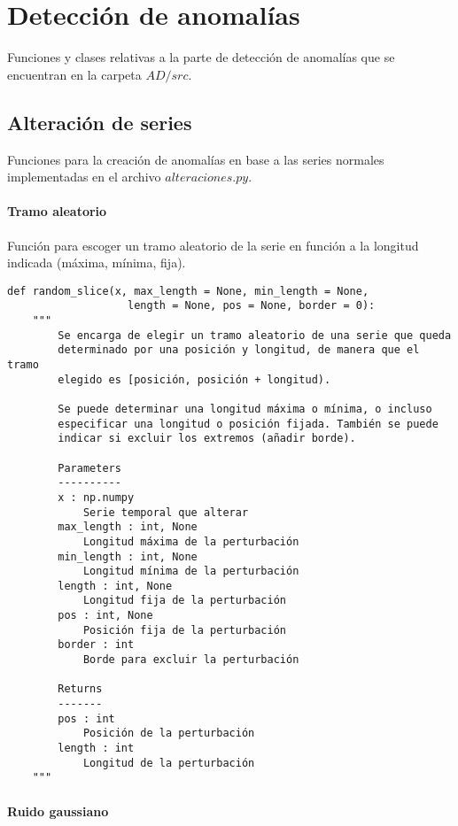 \section{Detección de anomalías}

Funciones y clases relativas a la parte de detección de anomalías que se encuentran en la carpeta $AD/src$.

\subsection{Alteración de series}

Funciones para la creación de anomalías en base a las series normales implementadas en el archivo $alteraciones.py$.

\paragraph{Tramo aleatorio}

Función para escoger un tramo aleatorio de la serie en función a la longitud indicada (máxima, mínima, fija).

\begin{lstlisting}
def random_slice(x, max_length = None, min_length = None,
                   length = None, pos = None, border = 0):
    """
        Se encarga de elegir un tramo aleatorio de una serie que queda
        determinado por una posición y longitud, de manera que el tramo
        elegido es [posición, posición + longitud).

        Se puede determinar una longitud máxima o mínima, o incluso
        especificar una longitud o posición fijada. También se puede
        indicar si excluir los extremos (añadir borde).

        Parameters
        ----------
        x : np.numpy
            Serie temporal que alterar
        max_length : int, None
            Longitud máxima de la perturbación
        min_length : int, None
            Longitud mínima de la perturbación
        length : int, None
            Longitud fija de la perturbación
        pos : int, None
            Posición fija de la perturbación
        border : int
            Borde para excluir la perturbación

        Returns
        -------
        pos : int
            Posición de la perturbación
        length : int
            Longitud de la perturbación
    """
\end{lstlisting}

\paragraph{Ruido gaussiano}

